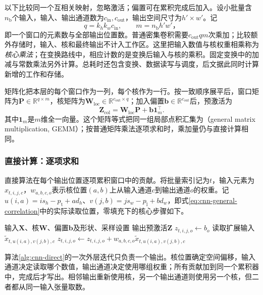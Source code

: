 以下比较同一个互相关映射，忽略激活；偏置可在累积完成后加入。设小批量含$n_{\mathrm b}$个输入，输入、输出通道数为$c_{\mathrm{in}},c_{\mathrm{out}}$，输出空间尺寸为$h'\times w'$。记
\[
  q=k_hk_wc_{\mathrm{in}},\qquad m=n_{\mathrm b}h'w'\text{，}
\]
即一个窗口的元素数与全部输出位置数。普通密集卷积需要$c_{\mathrm{out}}qm$次乘加；比较额外存储时，输入、核和最终输出不计入工作区。这里把输入数值与核权重相乘称为\emph{核心乘法}；在变换路线中，相应计数的是变换后输入与核的乘积。固定变换中的加减与常数乘法另外计算。总耗时还包含变换、数据读写与调度，后文据此同时计算新增的工作和存储。

矩阵化把本层的每个窗口作为一列，每个核作为一行。按一致顺序展平后，窗口矩阵为$\bm P\in\mathbb R^{q\times m}$，核矩阵为$\bm W_{\mathrm{loc}}\in\mathbb R^{c_{\mathrm{out}}\times q}$；加入偏置$\bm b\in\mathbb R^{c_{\mathrm{out}}}$后，预激活为
\begin{equation}
 \bm Z_{\mathrm{col}}=\bm W_{\mathrm{loc}}\bm P+\bm b\bm1_m^\top.
 \label{eq:cnn-im2col}
\end{equation}
其中$\bm1_m$是$m$维全一向量。这个矩阵等式把同一组局部点积汇集为（general matrix multiplication, GEMM）；按普通矩阵乘法逐项求和时，乘加量仍与直接计算相同。

\subsubsection{直接计算：逐项求和}
\label{sec:cnn-direct-implementation}

直接算法在每个输出位置逐项累积窗口中的贡献。将批量索引记为$t$，输入元素为$x_{t,i,j,c}$，$w_{a,b,c,o}$表示核位置$(a,b)$上从输入通道$c$到输出通道$o$的权重。记$u(i,a)=is_h-p_{\mathrm t}+ad_h$、$v(j,b)=js_w-p_{\mathrm l}+bd_w$，即式\eqref{eq:cnn-general-correlation}中的实际读取位置，零填充下的核心步骤如下。
\begin{algorithm}[直接多通道互相关]
  \label{alg:cnn-direct}
  \begin{algorithmic}[1]
    \Require 输入$\bm X$、核$\bm W$、偏置$\bm b$及形状、采样设置
    \Ensure 输出预激活$\bm Z$
      \State $z_{t,i,j,o}\gets b_o$
        \State 读取扩展输入$\widetilde x_{t,u(i,a),v(j,b),c}$
        \State $z_{t,i,j,o}\gets z_{t,i,j,o}+w_{a,b,c,o}\widetilde x_{t,u(i,a),v(j,b),c}$
      \EndFor
    \EndFor
  \end{algorithmic}
\end{algorithm}

算法\ref{alg:cnn-direct}的一次外层迭代只负责一个输出。核位置确定空间偏移，输入通道决定读取哪个数值，输出通道决定使用哪组权重；所有贡献加到同一个累积器中，完成后才写出。相邻输出重新使用核，另一个输出通道则使用另一个核，但二者都从同一输入张量取数。

